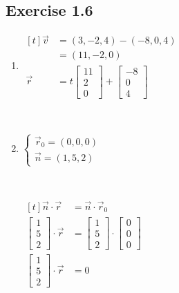 \documentclass[11pt,fleqn]{book} %
\begin{document}
\subsection*{Exercise 1.6}

\begin{enumerate}
    \item
    $\begin{aligned}[t]
        \vec{v} 
        & =(3, -2, 4) - (-8, 0, 4)                                                                   \\
        & = (11, -2, 0)
        \\
        \vec{r} 
        & = t\begin{bmatrix} 11 \\ 2 \\ 0 \end{bmatrix} + \begin{bmatrix} -8 \\ 0 \\ 4 \end{bmatrix}
    \end{aligned}$

    {~~~}

    \item
    $\begin{cases}
        \vec{r}_0 = (0, 0, 0) \\
        \vec{n} = (1, 5, 2)
    \end{cases}$

    {~~~}

    $\begin{aligned}[t]
        \vec{n} \cdot \vec{r}                                   
        & = \vec{n} \cdot \vec{r}_0                                                                   \\
        \begin{bmatrix} 1 \\ 5 \\ 2 \end{bmatrix} \cdot \vec{r} 
        & = \begin{bmatrix} 1 \\ 5 \\ 2 \end{bmatrix} \cdot \begin{bmatrix} 0 \\ 0 \\ 0 \end{bmatrix} \\
        \begin{bmatrix} 1 \\ 5 \\ 2 \end{bmatrix} \cdot \vec{r} 
        & = 0
    \end{aligned}$


\end{enumerate}
\end{document}
